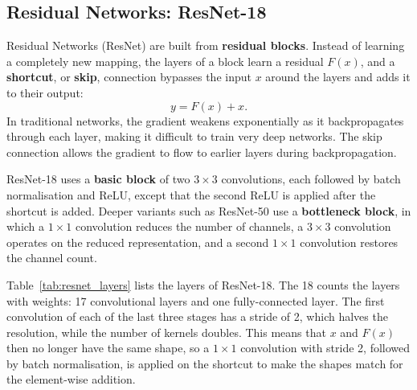 \subsection{Residual Networks: ResNet-18}
\label{sec:resnet}

Residual Networks (ResNet) \citep{he2016resnet} are built from \textbf{residual blocks}. Instead of learning a completely new mapping, the layers of a block learn a residual $F(x)$, and a \textbf{shortcut}, or \textbf{skip}, connection bypasses the input $x$ around the layers and adds it to their output:
\begin{equation}
y = F(x) + x.
\label{eq:residual}
\end{equation}
In traditional networks, the gradient weakens exponentially as it backpropagates through each layer, making it difficult to train very deep networks. The skip connection allows the gradient to flow to earlier layers during backpropagation.

ResNet-18 uses a \textbf{basic block} of two $3\times3$ convolutions, each followed by batch normalisation and ReLU, except that the second ReLU is applied after the shortcut is added. Deeper variants such as ResNet-50 use a \textbf{bottleneck block}, in which a $1\times1$ convolution reduces the number of channels, a $3\times3$ convolution operates on the reduced representation, and a second $1\times1$ convolution restores the channel count.

Table~\ref{tab:resnet_layers} lists the layers of ResNet-18. The 18 counts the layers with weights: 17 convolutional layers and one fully-connected layer. The first convolution of each of the last three stages has a stride of 2, which halves the resolution, while the number of kernels doubles. This means that $x$ and $F(x)$ then no longer have the same shape, so a $1\times1$ convolution with stride 2, followed by batch normalisation, is applied on the shortcut to make the shapes match for the element-wise addition.

